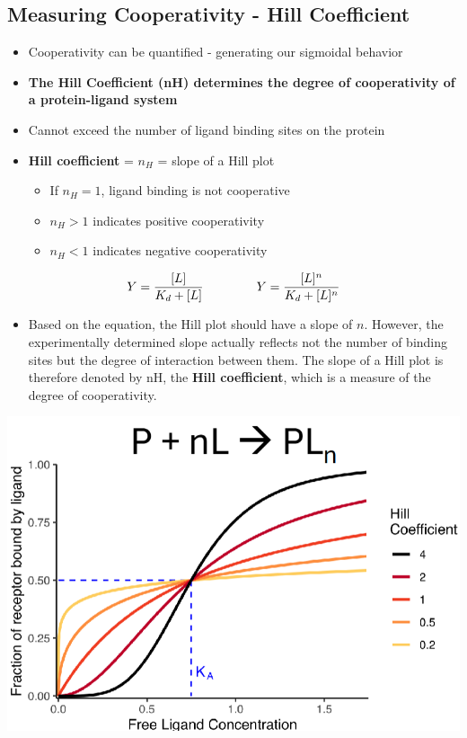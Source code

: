 \documentclass[10pt]{article}
\begin{document}
\subsection*{Measuring Cooperativity - Hill Coefficient}
\begin{itemize}
    \item Cooperativity can be quantified - generating our sigmoidal behavior
    \item \textbf{The Hill Coefficient (nH) determines the degree of cooperativity of a protein-ligand system}
    \item Cannot exceed the number of ligand binding sites on the protein
    \item \textbf{Hill coefficient} = $n_H$ = slope of a Hill plot
    \begin{itemize}
        \item If $n_H = 1$, ligand binding is not cooperative
        \item $n_H > 1$ indicates positive cooperativity
        \item $n_H < 1$ indicates negative cooperativity
    \end{itemize}
\end{itemize}
\[Y = \frac{[L]}{K_d + [L]} \hspace{1.5cm} Y = \frac{[L]^n}{K_d + [L]^n}\]
\begin{itemize}
    \item Based on the equation, the Hill plot should have a slope of $n$.  However, the experimentally determined slope actually reflects not the number of binding sites but the degree of interaction between them.  The slope of a Hill plot is therefore denoted by nH, the \textbf{Hill coefficient}, which is a measure of the degree of cooperativity.
\end{itemize}
\begin{center}
    \includegraphics*[scale=0.6]{L3_15.png}
\end{center}
\end{document}
